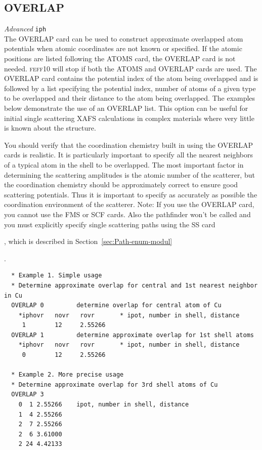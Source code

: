 \documentclass[11pt,oneside]{report} %
\renewcommand{\htmlref}[2]{\hyperlink{#2}{#1}}
\newcommand{\program}[1]{\textsc{#1}}
\newcommand{\feff}{\program{feff}}
\newcommand{\vnum}{10}
\newcommand{\feffcur}{\feff\vnum}
\newenvironment{Card}[4]%
      {\vspace{3ex}%
        \subsection{#1}
        \quad\textsl{#3}\newline
        \quad\texttt{#2}\newline%
        \label{card:#4}\\}
      {}
\renewcommand{\htmlref}[2]{{#1}} %
\begin{document}
\begin{Card}{OVERLAP}{iph}{Advanced}{ove}
  The OVERLAP card can be used to construct approximate overlapped
  atom potentials when atomic coordinates are not known or specified.
  If the atomic positions are listed following the \htmlref{ATOMS}{card:ato} 
  card, the OVERLAP card is not needed. {\feffcur} will stop if both 
  the ATOMS and OVERLAP cards are used. The OVERLAP card contains the 
  potential index of the atom being overlapped and is followed by a list
  specifying the potential index, number of atoms of a given type to
  be overlapped and their distance to the atom being overlapped. The
  examples below demonstrate the use of an OVERLAP list. This option
  can be useful for initial single scattering XAFS calculations in
  complex materials where very little is known about the structure.

  You should verify that the coordination chemistry built in using the
  OVERLAP cards is realistic. It is particularly important to specify
  all the nearest neighbors of a typical atom in the shell to be
  overlapped. The most important factor in determining the scattering
  amplitudes is the atomic number of the scatterer, but the coordination 
  chemistry should be approximately correct to ensure good scattering 
  potentials. Thus it is important to specify as accurately as possible 
  the coordination environment of the scatterer. Note: If you use the 
  OVERLAP card, you cannot use the \htmlref{FMS}{card:fms} or 
  \htmlref{SCF}{card:scf} cards. Also the pathfinder won't be called 
  and you must explicitly specify single scattering paths using the 
  \htmlref{SS}{card:ss} card
  \begin{latexonly}
   , which is described in Section~\ref{sec:Path-enum-modul}
  \end{latexonly}.

\begin{verbatim}
  * Example 1. Simple usage
  * Determine approximate overlap for central and 1st nearest neighbor in Cu
  OVERLAP 0         determine overlap for central atom of Cu
    *iphovr   novr   rovr       * ipot, number in shell, distance
     1        12     2.55266
  OVERLAP 1         determine approximate overlap for 1st shell atoms
    *iphovr   novr   rovr       * ipot, number in shell, distance
     0        12     2.55266

  * Example 2. More precise usage
  * Determine approximate overlap for 3rd shell atoms of Cu
  OVERLAP 3
    0  1 2.55266    ipot, number in shell, distance
    1  4 2.55266
    2  7 2.55266
    2  6 3.61000
    2 24 4.42133
\end{verbatim}
\end{Card}
\end{document}
